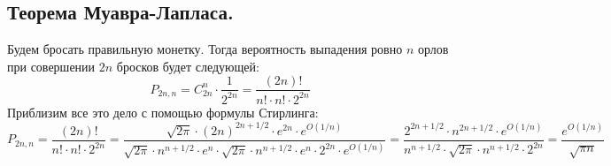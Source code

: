 \subsection{Теорема Муавра-Лапласа.}
Будем бросать правильную монетку. Тогда вероятность выпадения ровно $n$ орлов при совершении $2n$ бросков будет следующей:
\[
    P_{2n, n} = C_{2n}^n \cdot \frac{1}{2^{2n}} = \frac{(2n)!}{n! \cdot n! \cdot 2^{2n}}
\]
Приблизим все это дело с помощью формулы Стирлинга:
\[
    P_{2n, n} = \frac{(2n)!}{n! \cdot n! \cdot 2^{2n}} =
    \frac{
        \sqrt{2\pi} \cdot (2n)^{2n + 1/2} \cdot e^{2n} \cdot e^{O(1/n)}
    }{
        \sqrt{2\pi} \cdot n^{n + 1/2} \cdot e^{n} \cdot
        \sqrt{2\pi} \cdot n^{n + 1/2} \cdot e^{n} \cdot
        2^{2n}  \cdot e^{O(1/n)}
    } =
    \frac{
        2^{2n + 1/2} \cdot n^{2n + 1/2}  \cdot e^{O(1/n)}
    }{
        n^{n + 1/2} \cdot
        \sqrt{2\pi} \cdot n^{n + 1/2} \cdot
        2^{2n}
    } =
    \frac{
        e^{O(1/n)}
    }{
        \sqrt{\pi n}
    }
\]
